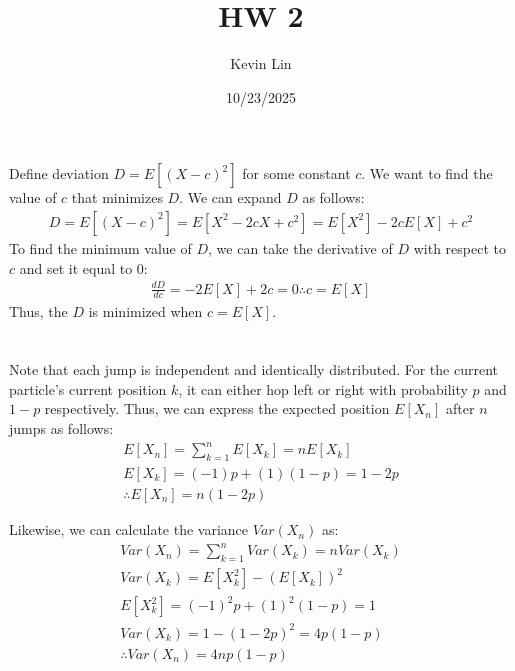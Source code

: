 \documentclass[11pt,a4paper,margin=1in]{article}
\title{HW 2}
\author{Kevin Lin}
\date{10/23/2025}
\begin{document}
\maketitle
\section{}
    Define deviation $D = E[(X - c)^2]$ for some constant $c$. We want to find
    the value of $c$ that minimizes $D$. We can expand $D$ as follows:
    \begin{gather*}
        D = E[(X - c)^2] = E[X^2 - 2cX + c^2] = E[X^2] - 2cE[X] + c^2
    \end{gather*}
    To find the minimum value of $D$, we can take the derivative of $D$
    with respect to $c$ and set it equal to 0:
    \begin{gather*}
        \frac{dD}{dc} = -2E[X] + 2c = 0 \therefore c = E[X]
    \end{gather*}
    Thus, the $D$ is minimized when $c = E[X]$.

\section{}
    Note that each jump is independent and identically distributed. For the current
    particle's current position $k$, it can either hop left or right with probability
    $p$ and $1 - p$ respectively. Thus, we can express the expected position $E[X_n]$
    after $n$ jumps as follows:
    \begin{gather*}
        E[X_n] = \sum_{k=1}^n E[X_k] = nE[X_k] \\
        E[X_k] = (-1)p + (1)(1 - p) = 1 - 2p \\
        \therefore E[X_n] = n(1 - 2p)
    \end{gather*}

    Likewise, we can calculate the variance $Var(X_n)$ as:
    \begin{gather*}
        Var(X_n) = \sum_{k=1}^n Var(X_k) = nVar(X_k) \\
        Var(X_k) = E[X_k^2] - (E[X_k])^2 \\ 
        E[X_k^2] = (-1)^2p + (1)^2(1 - p) = 1 \\
        Var(X_k) = 1 - (1 - 2p)^2 = 4p(1 - p) \\
        \therefore Var(X_n) = 4np(1 - p)
    \end{gather*}
\end{document}
